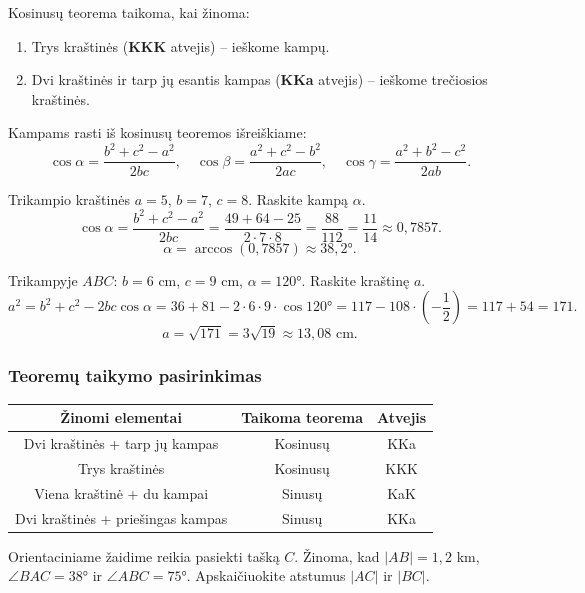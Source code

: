 Kosinusų teorema taikoma, kai žinoma:
\begin{enumerate}
  \item Trys kraštinės (\textbf{KKK} atvejis) – ieškome kampų.
  \item Dvi kraštinės ir tarp jų esantis kampas (\textbf{KKa} atvejis) – ieškome trečiosios kraštinės.
\end{enumerate}

Kampams rasti iš kosinusų teoremos išreiškiame:
\[
\cos\alpha = \frac{b^2 + c^2 - a^2}{2bc}, \quad
\cos\beta = \frac{a^2 + c^2 - b^2}{2ac}, \quad
\cos\gamma = \frac{a^2 + b^2 - c^2}{2ab}.
\]

\begin{example}
Trikampio kraštinės $a = 5$, $b = 7$, $c = 8$. Raskite kampą $\alpha$.
\[
\cos\alpha = \frac{b^2 + c^2 - a^2}{2bc}
= \frac{49 + 64 - 25}{2 \cdot 7 \cdot 8}
= \frac{88}{112}
= \frac{11}{14} \approx 0{,}7857.
\]
\[
\alpha = \arccos(0{,}7857) \approx 38{,}2°.
\]
\end{example}

\begin{example}
Trikampyje $ABC$: $b = 6$ cm, $c = 9$ cm, $\alpha = 120°$. Raskite kraštinę $a$.
\[
a^2 = b^2 + c^2 - 2bc\cos\alpha
= 36 + 81 - 2 \cdot 6 \cdot 9 \cdot \cos 120°
= 117 - 108 \cdot \left(-\frac{1}{2}\right)
= 117 + 54 = 171.
\]
\[
a = \sqrt{171} = 3\sqrt{19} \approx 13{,}08 \text{ cm}.
\]
\end{example}

\subsubsection*{Teoremų taikymo pasirinkimas}

\begin{center}
\begin{tabular}{|c|c|c|}
\hline
\textbf{Žinomi elementai} & \textbf{Taikoma teorema} & \textbf{Atvejis} \\
\hline
Dvi kraštinės + tarp jų kampas & Kosinusų & KKa \\
Trys kraštinės & Kosinusų & KKK \\
Viena kraštinė + du kampai & Sinusų & KaK \\
Dvi kraštinės + priešingas kampas & Sinusų & KKa \\
\hline
\end{tabular}
\end{center}

\begin{exercise}
Orientaciniame žaidime reikia pasiekti tašką $C$. Žinoma, kad $|AB| = 1{,}2$ km,
$\angle BAC = 38°$ ir $\angle ABC = 75°$. Apskaičiuokite atstumus $|AC|$ ir $|BC|$.
\end{exercise}

